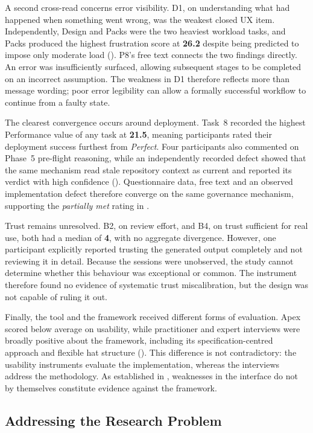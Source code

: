 A second cross-read concerns error visibility. D1, on understanding what had happened when something went wrong, was the weakest closed \ac{UX} item. Independently, Design and Packs were the two heaviest workload tasks, and Packs produced the highest frustration score at \textbf{26.2} despite being predicted to impose only moderate load (). P8's free text connects the two findings directly. An error was insufficiently surfaced, allowing subsequent stages to be completed on an incorrect assumption. The weakness in D1 therefore reflects more than message wording; poor error legibility can allow a formally successful workflow to continue from a faulty state.

The clearest convergence occurs around deployment. Task~8 recorded the highest Performance value of any task at \textbf{21.5}, meaning participants rated their deployment success furthest from \emph{Perfect}. Four participants also commented on Phase~5 pre-flight reasoning, while an independently recorded defect showed that the same mechanism read stale repository context as current and reported its verdict with high confidence (). Questionnaire data, free text and an observed implementation defect therefore converge on the same governance mechanism, supporting the \emph{partially met} rating in .

Trust remains unresolved. B2, on review effort, and B4, on trust sufficient for real use, both had a median of \textbf{4}, with no aggregate divergence. However, one participant explicitly reported trusting the generated output completely and not reviewing it in detail. Because the sessions were unobserved, the study cannot determine whether this behaviour was exceptional or common. The instrument therefore found no evidence of systematic trust miscalibration, but the design was not capable of ruling it out.

Finally, the tool and the framework received different forms of evaluation. Apex scored below average on usability, while practitioner and expert interviews were broadly positive about the framework, including its specification-centred approach and flexible hat structure (). This difference is not contradictory: the usability instruments evaluate the implementation, whereas the interviews address the methodology. As established in , weaknesses in the interface do not by themselves constitute evidence against the framework.

\subsection{Addressing the Research Problem}
\label{sec:eval_rq_answers}

